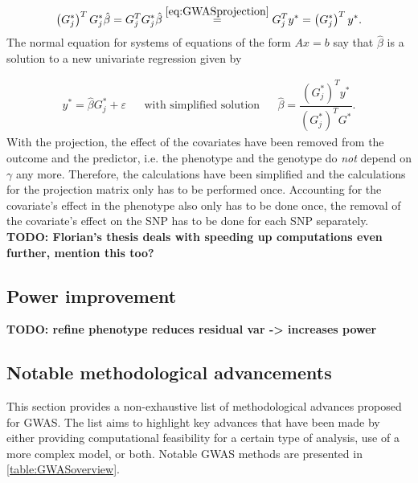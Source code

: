 \begin{equation}
	\left( G_j^{\ast} \right)^T G_j^{\ast} \hat{\beta} = G_j^T G_j^{\ast} \hat{\beta} \stackrel{\ref{eq:GWASprojection}}{=} G_j^T y^{\ast} = \left( G_j^{\ast} \right)^T y^{\ast}.
\end{equation}
The normal equation for systems of equations of the form $ Ax=b $ say that $ \hat{\beta} $ is a solution to a new univariate regression given by

\begin{align}\label{eq:univarGWAS}
	y^\ast = \hat{\beta} G_j^{\ast} + \varepsilon&   &\text{with simplified solution}&  &\hat{\beta} = \dfrac{\left( G_j^{\ast} \right)^T y^{\ast}}{\left( G_j^{\ast} \right)^T G^{\ast}}.
\end{align}
With the projection, the effect of the covariates have been removed from the outcome and the predictor, i.e. the phenotype and the genotype do \textit{not} depend on $ \gamma $ any more. Therefore, the calculations have been simplified and the calculations for the projection matrix only has to be performed once. Accounting for the covariate's effect in the phenotype also only has to be done once, the removal of the covariate's effect on the SNP has to be done for each SNP separately.
\textbf{TODO: Florian's thesis deals with speeding up computations even further, mention this too?}


\subsection{Power improvement}
\textbf{TODO: refine phenotype reduces residual var -> increases power}






\subsection{Notable methodological advancements}
This section provides a non-exhaustive list of methodological advances proposed for GWAS. The list aims to highlight key advances that have been made by either providing computational feasibility for a certain type of analysis, use of a more complex model, or both. Notable GWAS methods are presented in \cref{table:GWASoverview}. 

